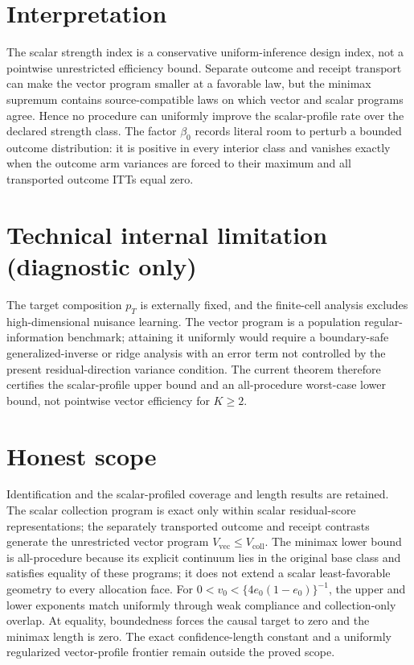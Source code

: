 \documentclass{article}
\begin{document}
\section{Interpretation}

The scalar strength index is a conservative uniform-inference design index, not a pointwise unrestricted efficiency bound. Separate outcome and receipt transport can make the vector program smaller at a favorable law, but the minimax supremum contains source-compatible laws on which vector and scalar programs agree. Hence no procedure can uniformly improve the scalar-profile rate over the declared strength class. The factor \(\beta_0\) records literal room to perturb a bounded outcome distribution: it is positive in every interior class and vanishes exactly when the outcome arm variances are forced to their maximum and all transported outcome ITTs equal zero.

\section*{Technical internal limitation (diagnostic only)}

The target composition \(p_T\) is externally fixed, and the finite-cell analysis excludes high-dimensional nuisance learning. The vector program is a population regular-information benchmark; attaining it uniformly would require a boundary-safe generalized-inverse or ridge analysis with an error term not controlled by the present residual-direction variance condition. The current theorem therefore certifies the scalar-profile upper bound and an all-procedure worst-case lower bound, not pointwise vector efficiency for \(K\ge2\).

\section{Honest scope}

Identification and the scalar-profiled coverage and length results are retained. The scalar collection program is exact only within scalar residual-score representations; the separately transported outcome and receipt contrasts generate the unrestricted vector program \(V_{\mathrm{vec}}\le V_{\mathrm{coll}}\). The minimax lower bound is all-procedure because its explicit continuum lies in the original base class and satisfies equality of these programs; it does not extend a scalar least-favorable geometry to every allocation face. For \(0<v_0<\{4e_0(1-e_0)\}^{-1}\), the upper and lower exponents match uniformly through weak compliance and collection-only overlap. At equality, boundedness forces the causal target to zero and the minimax length is zero. The exact confidence-length constant and a uniformly regularized vector-profile frontier remain outside the proved scope.
\end{document}

